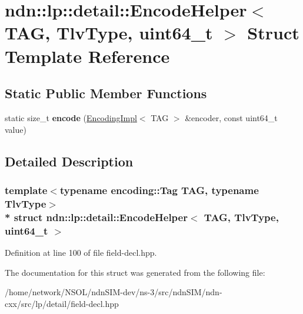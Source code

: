 \hypertarget{structndn_1_1lp_1_1detail_1_1EncodeHelper_3_01TAG_00_01TlvType_00_01uint64__t_01_4}{}\section{ndn\+:\+:lp\+:\+:detail\+:\+:Encode\+Helper$<$ T\+AG, Tlv\+Type, uint64\+\_\+t $>$ Struct Template Reference}
\label{structndn_1_1lp_1_1detail_1_1EncodeHelper_3_01TAG_00_01TlvType_00_01uint64__t_01_4}
\subsection*{Static Public Member Functions}
\begin{DoxyCompactItemize}
\item 
static size\+\_\+t {\bfseries encode} (\hyperlink{classndn_1_1encoding_1_1EncodingImpl}{Encoding\+Impl}$<$ T\+AG $>$ \&encoder, const uint64\+\_\+t value)\hypertarget{structndn_1_1lp_1_1detail_1_1EncodeHelper_3_01TAG_00_01TlvType_00_01uint64__t_01_4_a4c27be5a4379b7b66499cdae89d9a4aa}{}\label{structndn_1_1lp_1_1detail_1_1EncodeHelper_3_01TAG_00_01TlvType_00_01uint64__t_01_4_a4c27be5a4379b7b66499cdae89d9a4aa}

\end{DoxyCompactItemize}


\subsection{Detailed Description}
\subsubsection*{template$<$typename encoding\+::\+Tag T\+AG, typename Tlv\+Type$>$\\*
struct ndn\+::lp\+::detail\+::\+Encode\+Helper$<$ T\+A\+G, Tlv\+Type, uint64\+\_\+t $>$}



Definition at line 100 of file field-\/decl.\+hpp.



The documentation for this struct was generated from the following file\+:\begin{DoxyCompactItemize}
\item 
/home/network/\+N\+S\+O\+L/ndn\+S\+I\+M-\/dev/ns-\/3/src/ndn\+S\+I\+M/ndn-\/cxx/src/lp/detail/field-\/decl.\+hpp\end{DoxyCompactItemize}
